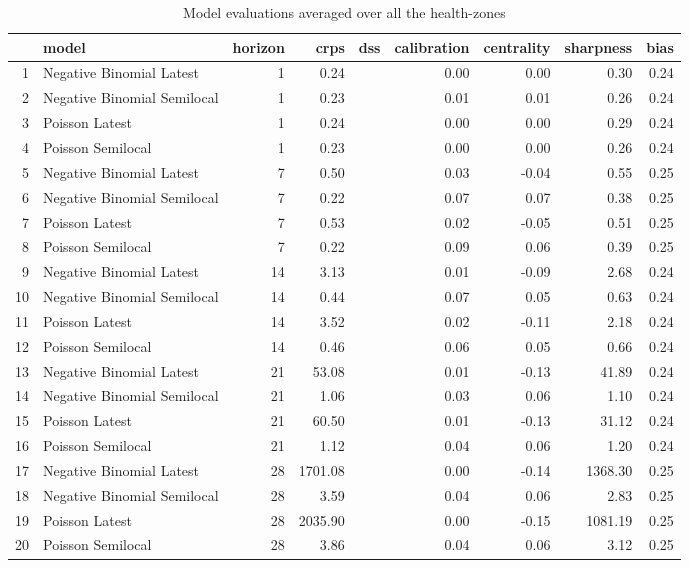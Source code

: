 \begin{table}[ht]
\centering
\begin{tabular}{rlrrrrrrr}
  \hline
 & model & horizon & crps & dss & calibration & centrality & sharpness & bias \\ 
  \hline
1 & Negative Binomial Latest &   1 & 0.24 &  & 0.00 & 0.00 & 0.30 & 0.24 \\ 
  2 & Negative Binomial Semilocal &   1 & 0.23 &  & 0.01 & 0.01 & 0.26 & 0.24 \\ 
  3 & Poisson Latest &   1 & 0.24 &  & 0.00 & 0.00 & 0.29 & 0.24 \\ 
  4 & Poisson Semilocal &   1 & 0.23 &  & 0.00 & 0.00 & 0.26 & 0.24 \\ 
  5 & Negative Binomial Latest &   7 & 0.50 &  & 0.03 & -0.04 & 0.55 & 0.25 \\ 
  6 & Negative Binomial Semilocal &   7 & 0.22 &  & 0.07 & 0.07 & 0.38 & 0.25 \\ 
  7 & Poisson Latest &   7 & 0.53 &  & 0.02 & -0.05 & 0.51 & 0.25 \\ 
  8 & Poisson Semilocal &   7 & 0.22 &  & 0.09 & 0.06 & 0.39 & 0.25 \\ 
  9 & Negative Binomial Latest &  14 & 3.13 &  & 0.01 & -0.09 & 2.68 & 0.24 \\ 
  10 & Negative Binomial Semilocal &  14 & 0.44 &  & 0.07 & 0.05 & 0.63 & 0.24 \\ 
  11 & Poisson Latest &  14 & 3.52 &  & 0.02 & -0.11 & 2.18 & 0.24 \\ 
  12 & Poisson Semilocal &  14 & 0.46 &  & 0.06 & 0.05 & 0.66 & 0.24 \\ 
  13 & Negative Binomial Latest &  21 & 53.08 &  & 0.01 & -0.13 & 41.89 & 0.24 \\ 
  14 & Negative Binomial Semilocal &  21 & 1.06 &  & 0.03 & 0.06 & 1.10 & 0.24 \\ 
  15 & Poisson Latest &  21 & 60.50 &  & 0.01 & -0.13 & 31.12 & 0.24 \\ 
  16 & Poisson Semilocal &  21 & 1.12 &  & 0.04 & 0.06 & 1.20 & 0.24 \\ 
  17 & Negative Binomial Latest &  28 & 1701.08 &  & 0.00 & -0.14 & 1368.30 & 0.25 \\ 
  18 & Negative Binomial Semilocal &  28 & 3.59 &  & 0.04 & 0.06 & 2.83 & 0.25 \\ 
  19 & Poisson Latest &  28 & 2035.90 &  & 0.00 & -0.15 & 1081.19 & 0.25 \\ 
  20 & Poisson Semilocal &  28 & 3.86 &  & 0.04 & 0.06 & 3.12 & 0.25 \\ 
   \hline
\end{tabular}
\caption{Model evaluations averaged over all the health-zones} 
\label{tab:hz_evo}
\end{table}
